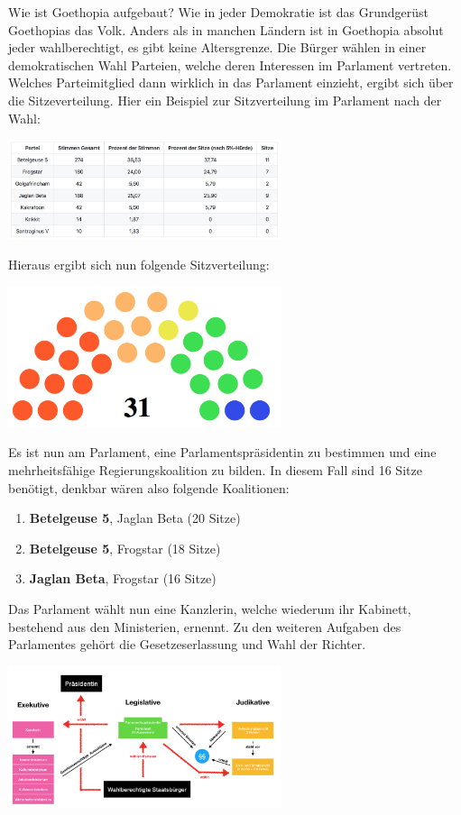 \documentclass{sasbase}
\begin{document}
\begin{question}{Wie ist Goethopia aufgebaut?}
	Wie in jeder Demokratie ist das Grundger\"{u}st Goethopias das Volk. Anders als in manchen L\"{a}ndern ist in Goethopia absolut jeder wahlberechtigt, es gibt keine Altersgrenze. Die B\"{u}rger w\"{a}hlen in einer demokratischen Wahl Parteien, welche deren Interessen im Parlament vertreten. Welches Parteimitglied dann wirklich in das Parlament einzieht, ergibt sich \"{u}ber die Sitzeverteilung. Hier ein Beispiel zur Sitzverteilung im Parlament nach der Wahl:
	\begin{center}
		\includegraphics[width=8cm]{Tabelle_Beispiel_Sitzverteilung.png}
	\end{center}
	Hieraus ergibt sich nun folgende Sitzverteilung:
	\begin{center}
	\includegraphics[width=8cm]{Parlament.png}
	\end{center}
Es ist nun am Parlament, eine Parlamentspr\"{a}sidentin zu bestimmen und eine mehrheitsf\"{a}hige Regierungskoalition zu bilden. In diesem Fall sind 16 Sitze ben\"{o}tigt, denkbar w\"{a}ren also folgende Koalitionen:
	\begin{enumerate}[label=-]
		\item \textbf{Betelgeuse 5}, Jaglan Beta (20 Sitze)
		\item \textbf{Betelgeuse 5}, Frogstar (18 Sitze)
		\item \textbf{Jaglan Beta}, Frogstar (16 Sitze)
	\end{enumerate}
	Das Parlament w\"{a}hlt nun eine Kanzlerin, welche wiederum ihr Kabinett, bestehend aus den Ministerien, ernennt. Zu den weiteren Aufgaben des Parlamentes geh\"{o}rt die Gesetzeserlassung und Wahl der Richter.
	\begin{center}
	\includegraphics[width=8cm]{Verfassung.png}
\end{center}
\end{question}
\end{document}
